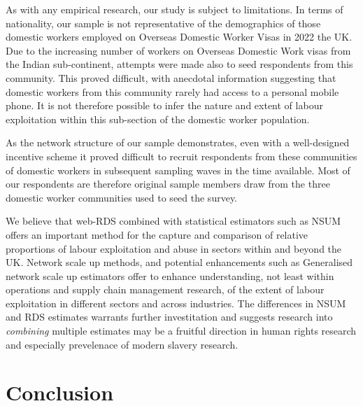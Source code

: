 \documentclass[
  12pt,
  letterpaper,
  DIV=11,
  numbers=noendperiod]{scrartcl}
\theoremstyle{plain}
\theoremstyle{definition}
\begin{document}
As with any empirical research, our study is subject to limitations. In
terms of nationality, our sample is not representative of the
demographics of those domestic workers employed on Overseas Domestic
Worker Visas in 2022 the UK. Due to the increasing number of workers on
Overseas Domestic Work visas from the Indian sub-continent, attempts
were made also to seed respondents from this community. This proved
difficult, with anecdotal information suggesting that domestic workers
from this community rarely had access to a personal mobile phone. It is
not therefore possible to infer the nature and extent of labour
exploitation within this sub-section of the domestic worker population.

As the network structure of our sample demonstrates, even with a
well-designed incentive scheme it proved difficult to recruit
respondents from these communities of domestic workers in subsequent
sampling waves in the time available. Most of our respondents are
therefore original sample members draw from the three domestic worker
communities used to seed the survey.

We believe that web-RDS combined with statistical estimators such as
NSUM offers an important method for the capture and comparison of
relative proportions of labour exploitation and abuse in sectors within
and beyond the UK. Network scale up methods, and potential enhancements
such as Generalised network scale up estimators offer to enhance
understanding, not least within operations and supply chain management
research, of the extent of labour exploitation in different sectors and
across industries. The differences in NSUM and RDS estimates warrants
further investitation and suggests research into \emph{combining}
multiple estimates may be a fruitful direction in human rights research
and especially prevelenace of modern slavery research.

\section{Conclusion}\label{conclusion}
\end{document}
